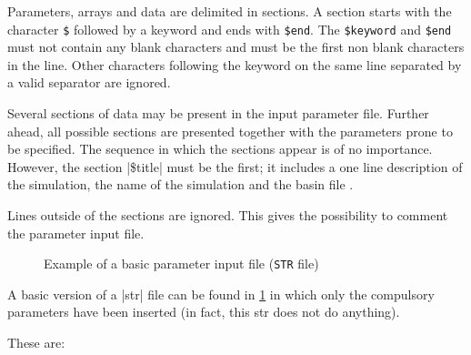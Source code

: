 Parameters, arrays and data are delimited in sections.
A section starts with the character {\tt \$} followed by a keyword and
ends with {\tt \$end}. The {\tt \$keyword} and {\tt \$end} must not
contain any blank characters and must be the first non blank characters
in the line. Other characters following the keyword on the same line
separated by a valid separator are ignored.

Several sections of data may be present in the input parameter file.
Further ahead, all possible sections are presented together with
 the parameters prone to be specified.
The sequence in
which the sections appear is of no importance. However,
the section |\$title| must be the first; it includes
a one line description of the simulation, the name of the simulation
and the basin file .

Lines outside of the sections are ignored. This gives
the possibility to comment the parameter input file.

\begin{figure}[htbp]
\begin{alltt}

\end{alltt}
\caption{Example of a basic parameter input file ({\tt STR} file)}
\label{fig:basic}
\end{figure}


A basic version of a |str| file can be found in \ref{fig:basic} in which
only the compulsory parameters have been inserted (in fact, this str does not do anything).

These are:


